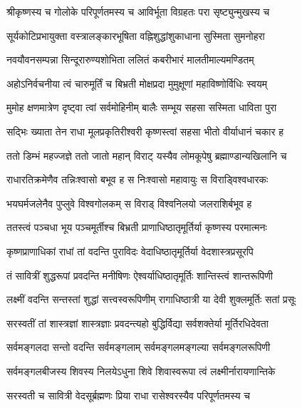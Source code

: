 

\twolineshloka
{श्रीकृष्णस्य च गोलोके परिपूर्णतमस्य च}
{आविर्भूता विग्रहतः परा सृष्ट्युन्मुखस्य च}

\twolineshloka
{सूर्यकोटिप्रभायुक्ता वस्त्रालङ्कारभूषिता}
{वह्निशुद्धांशुकाधाना सुस्मिता सुमनोहरा}

\twolineshloka
{नवयौवनसम्पन्ना सिन्दूरारुण्यशोभिता}
{ललितं कबरीभारं मालतीमाल्यमण्डितम्}

\twolineshloka
{अहोऽनिर्वचनीया त्वं चारुमूर्तिं च बिभ्रती}
{मोक्षप्रदा मुमुक्षूणां महाविष्णोर्विधिः स्वयम्}

\twolineshloka
{मुमोह क्षणमात्रेण दृष्ट्वा त्वां सर्वमोहिनीम्}
{बालैः सम्भूय सहसा सस्मिता धाविता पुरा}

\twolineshloka
{सद्भिः ख्याता तेन राधा मूलप्रकृतिरीश्वरी}
{कृष्णस्त्वां सहसा भीतो वीर्याधानं चकार ह}

\twolineshloka
{ततो डिम्भं महज्जज्ञे ततो जातो महान् विराट्}
{यस्यैव लोमकूपेषु ब्रह्माण्डान्यखिलानि च}

\twolineshloka
{राधारतिक्रमेणैव तन्निःश्वासो बभूव ह}
{स निःश्वासो महावायुः स विराड्\mbox{}विश्वधारकः}

\twolineshloka
{भयघर्मजलेनैव पुप्लुवे विश्वगोलकम्}
{स विराड् विश्वनिलयो जलराशिर्बभूव ह}

\twolineshloka
{ततस्त्वं पञ्चधा भूय पञ्चमूर्तीश्च बिभ्रती}
{प्राणाधिष्ठातृमूर्तिर्या कृष्णस्य परमात्मनः}

\twolineshloka
{कृष्णप्राणाधिकां राधां तां वदन्ति पुराविदः}
{वेदाधिष्ठातृमूर्तिर्या वेदशास्त्रप्रसूरपि}

\twolineshloka
{तं सावित्रीं शुद्धरूपां प्रवदन्ति मनीषिणः}
{ऐश्वर्याधिष्ठातृमूर्तिः शान्तिस्त्वं शान्तरूपिणी}

\twolineshloka
{लक्ष्मीं वदन्ति सन्तस्तां शुद्धां सत्त्‍‌वस्वरूपिणीम्}
{रागाधिष्ठात्री या देवी शुक्लमूर्तिः सतां प्रसूः}

\twolineshloka
{सरस्वतीं तां शास्त्रज्ञां शास्त्रज्ञाः प्रवदन्त्यहो}
{बुद्धिर्विद्या सर्वशक्तेर्या मूर्तिरधिदेवता}

\twolineshloka
{सर्वमङ्गलदा सन्तो वदन्ति सर्वमङ्गलाम्}
{सर्वमङ्गलमङ्गल्या सर्वमङ्गलरूपिणी}

\twolineshloka
{सर्वमङ्गलबीजस्य शिवस्य निलयेऽधुना}
{शिवे शिवास्वरूपा त्वं लक्ष्मीर्नारायणान्तिके}

\twolineshloka
{सरस्वती च सावित्री वेदसू‌र्ब्रह्मणः प्रिया}
{राधा रासेश्वरस्यैव परिपूर्णतमस्य च}

